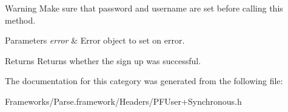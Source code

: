 \begin{DoxyWarning}{Warning}
Make sure that password and username are set before calling this method.
\end{DoxyWarning}

\begin{DoxyParams}{Parameters}
{\em error} & Error object to set on error.\\
\hline
\end{DoxyParams}
\begin{DoxyReturn}{Returns}
Returns whether the sign up was successful. 
\end{DoxyReturn}


The documentation for this category was generated from the following file\+:\begin{DoxyCompactItemize}
\item 
Frameworks/\+Parse.\+framework/\+Headers/P\+F\+User+\+Synchronous.\+h\end{DoxyCompactItemize}
